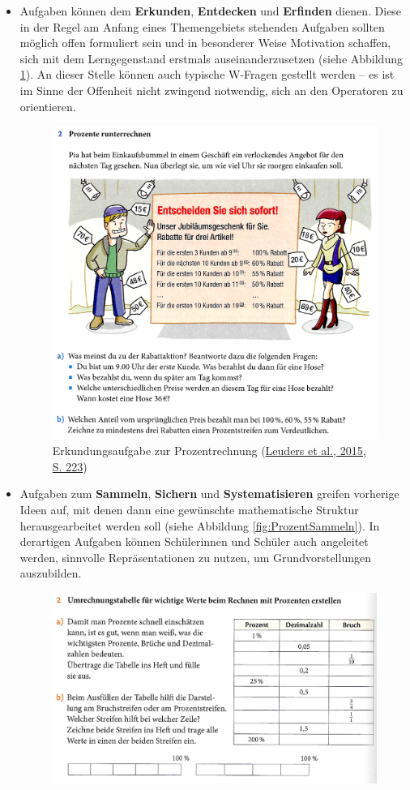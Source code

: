 \documentclass[
  ngerman,
]{scrbook}
\theoremstyle{definition}
\theoremstyle{definition}
\theoremstyle{definition}
\theoremstyle{definition}
\theoremstyle{remark}
\begin{document}
\begin{itemize}
\item
  Aufgaben können dem \textbf{Erkunden}, \textbf{Entdecken} und \textbf{Erfinden} dienen. Diese in der Regel am Anfang eines Themengebiets stehenden Aufgaben sollten möglich offen formuliert sein und in besonderer Weise Motivation schaffen, sich mit dem Lerngegenstand erstmals auseinanderzusetzen (siehe Abbildung \ref{fig:ProzentErkunden}). An dieser Stelle können auch typische W-Fragen gestellt werden -- es ist im Sinne der Offenheit nicht zwingend notwendig, sich an den Operatoren zu orientieren.

  \begin{figure}

    {\centering \includegraphics[width=0.75\linewidth]{pictures/10-ProzentErkunden} 

    }

    \caption{Erkundungsaufgabe zur Prozentrechnung (\protect\hyperlink{ref-Barzel2015a}{Leuders et al., 2015, S. 223})}\label{fig:ProzentErkunden}
    \end{figure}
\item
  Aufgaben zum \textbf{Sammeln}, \textbf{Sichern} und \textbf{Systematisieren} greifen vorherige Ideen auf, mit denen dann eine gewünschte mathematische Struktur herausgearbeitet werden soll (siehe Abbildung \ref{fig:ProzentSammeln}). In derartigen Aufgaben können Schülerinnen und Schüler auch angeleitet werden, sinnvolle Repräsentationen zu nutzen, um Grundvorstellungen auszubilden.

  \begin{figure}

    {\centering \includegraphics[width=0.75\linewidth]{pictures/10-ProzentSammeln} 

}
\end{figure}
\end{itemize}
\end{document}
